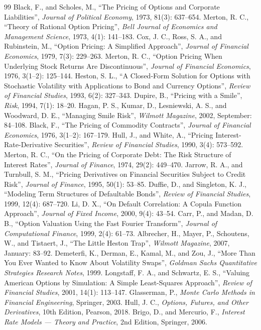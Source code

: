 \begin{thebibliography}{99}
 Black, F., and Scholes, M., ``The Pricing of Options and Corporate Liabilities'', \emph{Journal of Political Economy}, 1973, 81(3): 637--654.
 Merton, R. C., ``Theory of Rational Option Pricing'', \emph{Bell Journal of Economics and Management Science}, 1973, 4(1): 141--183.
 Cox, J. C., Ross, S. A., and Rubinstein, M., ``Option Pricing: A Simplified Approach'', \emph{Journal of Financial Economics}, 1979, 7(3): 229--263.
 Merton, R. C., ``Option Pricing When Underlying Stock Returns Are Discontinuous'', \emph{Journal of Financial Economics}, 1976, 3(1--2): 125--144.
 Heston, S. L., ``A Closed-Form Solution for Options with Stochastic Volatility with Applications to Bond and Currency Options'', \emph{Review of Financial Studies}, 1993, 6(2): 327--343.
 Dupire, B., ``Pricing with a Smile'', \emph{Risk}, 1994, 7(1): 18--20.
 Hagan, P. S., Kumar, D., Lesniewski, A. S., and Woodward, D. E., ``Managing Smile Risk'', \emph{Wilmott Magazine}, 2002, September: 84--108.
 Black, F., ``The Pricing of Commodity Contracts'', \emph{Journal of Financial Economics}, 1976, 3(1--2): 167--179.
 Hull, J., and White, A., ``Pricing Interest-Rate-Derivative Securities'', \emph{Review of Financial Studies}, 1990, 3(4): 573--592.
 Merton, R. C., ``On the Pricing of Corporate Debt: The Risk Structure of Interest Rates'', \emph{Journal of Finance}, 1974, 29(2): 449--470.
 Jarrow, R. A., and Turnbull, S. M., ``Pricing Derivatives on Financial Securities Subject to Credit Risk'', \emph{Journal of Finance}, 1995, 50(1): 53--85.
 Duffie, D., and Singleton, K. J., ``Modeling Term Structures of Defaultable Bonds'', \emph{Review of Financial Studies}, 1999, 12(4): 687--720.
 Li, D. X., ``On Default Correlation: A Copula Function Approach'', \emph{Journal of Fixed Income}, 2000, 9(4): 43--54.
 Carr, P., and Madan, D. B., ``Option Valuation Using the Fast Fourier Transform'', \emph{Journal of Computational Finance}, 1999, 2(4): 61--73.
 Albrecher, H., Mayer, P., Schoutens, W., and Tistaert, J., ``The Little Heston Trap'', \emph{Wilmott Magazine}, 2007, January: 83--92.
 Demeterfi, K., Derman, E., Kamal, M., and Zou, J., ``More Than You Ever Wanted to Know About Volatility Swaps'', \emph{Goldman Sachs Quantitative Strategies Research Notes}, 1999.
 Longstaff, F. A., and Schwartz, E. S., ``Valuing American Options by Simulation: A Simple Least-Squares Approach'', \emph{Review of Financial Studies}, 2001, 14(1): 113--147.
 Glasserman, P., \emph{Monte Carlo Methods in Financial Engineering}, Springer, 2003.
 Hull, J. C., \emph{Options, Futures, and Other Derivatives}, 10th Edition, Pearson, 2018.
 Brigo, D., and Mercurio, F., \emph{Interest Rate Models --- Theory and Practice}, 2nd Edition, Springer, 2006.


\end{thebibliography}
